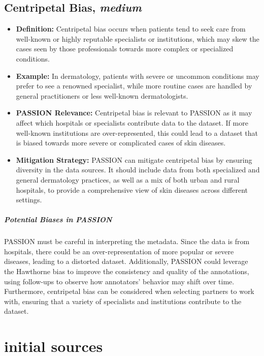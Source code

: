 \begin{refsection}
		\subsection{Centripetal Bias, \textit{medium}}
		\begin{itemize}
			\item \textbf{Definition:} Centripetal bias occurs when patients tend to seek care from well-known or highly reputable specialists or institutions, which may skew the cases seen by those professionals towards more complex or specialized conditions.
			\item \textbf{Example:} In dermatology, patients with severe or uncommon conditions may prefer to see a renowned specialist, while more routine cases are handled by general practitioners or less well-known dermatologists.
			\item \textbf{PASSION Relevance:} Centripetal bias is relevant to PASSION as it may affect which hospitals or specialists contribute data to the dataset. If more well-known institutions are over-represented, this could lead to a dataset that is biased towards more severe or complicated cases of skin diseases.
			\item \textbf{Mitigation Strategy:} PASSION can mitigate centripetal bias by ensuring diversity in the data sources. It should include data from both specialized and general dermatology practices, as well as a mix of both urban and rural hospitals, to provide a comprehensive view of skin diseases across different settings.
		\end{itemize}
		
		\subparagraph{Potential Biases in PASSION}
		PASSION must be careful in interpreting the metadata. Since the data is from hospitals, there could be an over-representation of more popular or severe diseases, leading to a distorted dataset. Additionally, PASSION could leverage the Hawthorne bias to improve the consistency and quality of the annotations, using follow-ups to observe how annotators' behavior may shift over time. Furthermore, centripetal bias can be considered when selecting partners to work with, ensuring that a variety of specialists and institutions contribute to the dataset.
		
		
		
		\section{initial sources}
		

\end{refsection}
